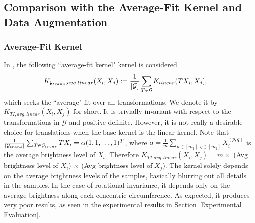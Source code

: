 \documentclass{article}
\theoremstyle{plain}
\theoremstyle{definition}
\theoremstyle{remark}
\begin{document}
\subsection{Comparison with the Average-Fit Kernel and Data Augmentation}
\subsubsection{Average-Fit Kernel}
In \cite{haasdonk2007invariant}, the following ``average-fit kernel" kernel is considered
\begin{align} \label{Average-Fit}
    K_{\mathcal{G}_{trans},avg,linear}(X_i,X_j) &:= \frac{1}{|{\cal{G}}]} \sum_{T \in {\cal{G}}} K_{linear}(TX_i,X_j),
\end{align} 
which seeks the ``average" fit over all transformations. We denote it by $K_{TI,avg,linear}(X_i,X_j)$ for short. It is trivially invariant with respect to the transformations in $\mathcal{G}$ and positive definite. However, it is not really a desirable choice for translations when the base kernel is the linear kernel. Note that $\frac{1}{|{\cal{G}}_{trans}]} \sum_{T \in {\cal{G}}_{trans}} TX_i = \alpha (1,1, \ldots, 1)^T$, where $\alpha = \frac{1}{m} \sum_{p\in [m_1], q \in [m_2]} X^{(p, q)}_i $ is the average brightness level of $X_i$. Therefore $K_{TI,avg,linear}(X_i,X_j) = m \times$ (Avg brightness level of $X_i$) $\times$ (Avg brightness level of $X_j$). The kernel solely depends on the average brightness levels of the samples, basically blurring out all details in the samples. In the case of rotational invariance, it depends only on the average brightness along each concentric circumference. As expected, it produces very poor results, as seen in the experimental results in Section \ref{Experimental Evaluation}.
\end{document}
